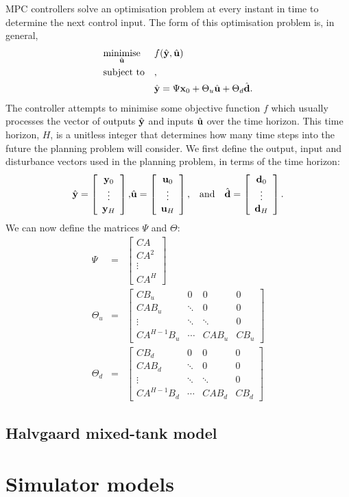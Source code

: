 MPC controllers solve an optimisation problem at every instant in time to determine the next control input.
The form of this optimisation problem is, in general,
\begin{equation}
	\label{eq:mpc-opt}
	\optimise
		{minimise}{\hvec{u}}
		{f(\hvec{y}, \hvec{u})}
		{\hvec{y} = \Psi \vec{x}_0 + \Theta_u \hvec{u} + \Theta_d \hvec{d}}
\end{equation}
The controller attempts to minimise some objective function $f$ which usually processes the vector of outputs $\hat{\mathbf{y}}$ and inputs $\hat{\mathbf{u}}$ over the time horizon.
This time horizon, $H$, is a unitless integer that determines how many time steps into the future the planning problem will consider.
We first define the output, input and disturbance vectors used in the planning problem, in terms of the time horizon:
\begin{eqnarray}
	\label{eq:mpc-vectors}
	\hat{\mathbf{y}} = \left[\begin{array}{c}
		\mathbf{y}_0 \\
		\vdots \\
		\mathbf{y}_H
	\end{array}\right],
	&
	\hat{\mathbf{u}} = \left[\begin{array}{c}
		\mathbf{u}_0 \\
		\vdots \\
		\mathbf{u}_H
	\end{array}\right],
	&
	\text{and} \quad \hat{\mathbf{d}} = \left[\begin{array}{c}
		\mathbf{d}_0 \\
		\vdots \\
		\mathbf{d}_H
	\end{array}\right].
\end{eqnarray}
We can now define the matrices $\Psi$ and $\Theta$:
\begin{eqnarray}
	\label{eq:mpc-psi}
	\Psi &=& \left[\begin{array}{c}
		CA \\ CA^2 \\ \vdots \\ CA^H
	\end{array}\right]
	\\\label{eq:mpc-theta-u}
	\Theta_u &=& \left[\begin{array}{cccc}
		CB_u & 0 & 0 & 0 \\
		CAB_u & \ddots & 0 & 0 \\
		\vdots & \ddots & \ddots & 0 \\
		CA^{H-1}B_u & \cdots & CAB_u & CB_u
	\end{array}\right]
	\\\label{eq:mpc-theta-d}
	\Theta_d &=& \left[\begin{array}{cccc}
		CB_d & 0 & 0 & 0 \\
		CAB_d & \ddots & 0 & 0 \\
		\vdots & \ddots & \ddots & 0 \\
		CA^{H-1}B_d & \cdots & CAB_d & CB_d
	\end{array}\right]
\end{eqnarray}

\subsection{Halvgaard mixed-tank model}
\label{sec:model:halvgaard}

\section{Simulator models}
